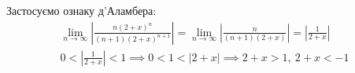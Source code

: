 \documentclass[../rgr_2.tex]{subfiles}
\begin{document}
\Solution
Застосуємо ознаку д'Аламбера:
\begin{align}
	\lim_{n\to\infty}\left| \frac{n(2+x)^n}{(n+1)(2+x)^{n+1}} \right|
	= \lim_{n\to\infty} \left| \frac{n}{(n+1)(2+x)} \right|
	= \left| \frac{1}{2+x} \right|  \\
	0<\left| \frac{1}{2+x} \right| < 1 \implies
	0 < 1 < |2+x| \implies
	2+x > 1,~ 2+x < -1
\end{align}

\end{document}
